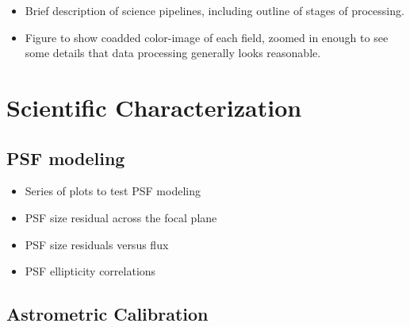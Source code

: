 

\begin{itemize}

\item Brief description of science pipelines, including outline of stages of processing.

\item Figure to show coadded color-image of each field, zoomed in enough to see some details that data processing generally looks reasonable.

\end{itemize}

\section{Scientific Characterization}

\subsection{PSF modeling}

\begin{itemize}

\item Series of plots to test PSF modeling

\item PSF size residual across the focal plane

\item PSF size residuals versus flux

\item PSF ellipticity correlations

\end{itemize}

\subsection{Astrometric Calibration}

